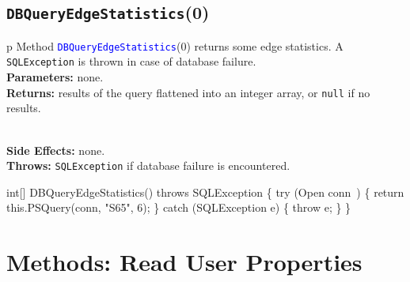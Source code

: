 \subsection{\texttt{DBQueryEdgeStatistics}(0)}
\begin{tabular}{p{\textwidth}}
\toprule
{}
Method \textcolor{blue}{{\tt{}\protect{}DBQueryEdgeStatistics}}(0) returns some edge statistics.
A {\tt{}SQLException} is thrown in case of database failure.\\
\midrule
\textbf{Parameters:} none.\\
\textbf{Returns:} results of the query flattened into an integer array, or
{\tt{}null} if no results.

\\
\textbf{Side Effects:} none.\\
\textbf{Throws:} {\tt{}SQLException} if database failure is encountered.\\
\bottomrule
\end{tabular}
\nwenddocs{}\endmoddef{}
int[] DBQueryEdgeStatistics() throws SQLException \{
  try (\LA{}Open \code{}conn\edoc{}~{\nwtagstyle{}}\RA{}) \{
    return this.PSQuery(conn, "S65", 6);
  \} catch (SQLException e) \{
    throw e;
  \}
\}
\eatline
{}\nwendcode{}\nwdocspar
\section{Methods: Read User Properties}

